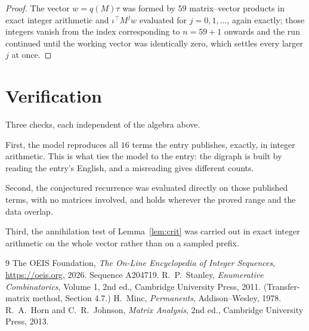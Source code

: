 \documentclass[11pt,a4paper]{article}
\theoremstyle{plain}
\theoremstyle{definition}
\begin{document}
\begin{proof}
The vector $w=q(M)\tau$ was formed by $59$ matrix--vector products in exact integer
arithmetic and $\iota^{\!\top}M^{j}w$ evaluated for $j=0,1,\dots$, again exactly; those
integers vanish from the index corresponding to $n=59+1$ onwards and the run continued
until the working vector was identically zero, which settles every larger $j$ at once.
\end{proof}

\section{Verification}

Three checks, each independent of the algebra above.

First, the model reproduces all $16$ terms the entry publishes, exactly, in integer
arithmetic. This is what ties the model to the entry: the digraph is built by reading the
entry's English, and a misreading gives different counts.

Second, the conjectured recurrence was evaluated directly on those published terms, with no
matrices involved, and holds wherever the proved range and the data overlap.

Third, the annihilation test of Lemma~\ref{lem:crit} was carried out in exact integer
arithmetic on the whole vector rather than on a sampled prefix.

\begin{thebibliography}{9}
 The OEIS Foundation, \emph{The On-Line Encyclopedia of Integer
Sequences}, \url{https://oeis.org}, 2026. Sequence A204719.
 R.~P.~Stanley, \emph{Enumerative Combinatorics}, Volume 1, 2nd ed.,
Cambridge University Press, 2011. (Transfer-matrix method, Section 4.7.)
 H.~Minc, \emph{Permanents}, Addison--Wesley, 1978.
 R.~A.~Horn and C.~R.~Johnson, \emph{Matrix Analysis}, 2nd ed., Cambridge
University Press, 2013.
\end{thebibliography}
\end{document}
